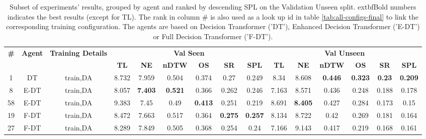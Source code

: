 \begin{table}
\centering
\caption{\label{tab:dagger}Subset of experiments' results, grouped by agent and ranked by descending SPL on the Validation Unseen split. 	extbf{Bold} numbers indicates the best results (except for TL). The rank in column \# is also used as a look up id in table \ref{tab:all-configs-final} to link the corresponding training configuration.     \newline The agents are based on Decision Transformer ('DT'), Enhanced Decision Transformer ('E-DT') or Full Decision Transformer ('F-DT').}
\begin{tabular}{@{\hskip3pt}c@{\hskip3pt}c@{\hskip3pt}c@{\hskip3pt}c@{\hskip3pt}c@{\hskip3pt}c@{\hskip3pt}c@{\hskip3pt}c@{\hskip3pt}c@{\hskip3pt}c@{\hskip3pt}c@{\hskip3pt}c@{\hskip3pt}c@{\hskip3pt}c@{\hskip3pt}c}
\toprule
\textbf{\#} & \textbf{Agent} & \textbf{Training Details} & \multicolumn{6}{c}{\textbf{Val Seen}} & \multicolumn{6}{c}{\textbf{Val Unseen}} \\
 \textbf{~} &     \textbf{~} &                \textbf{~} &       \textbf{TL} &     \textbf{NE} &   \textbf{nDTW} &     \textbf{OS} &     \textbf{SR} &    \textbf{SPL} &         \textbf{TL} &     \textbf{NE} &   \textbf{nDTW} &     \textbf{OS} &    \textbf{SR} &    \textbf{SPL} \\
\midrule
          1 &             DT &                  train,DA &             8.732 &           7.959 &           0.504 &           0.374 &            0.27 &           0.249 &                8.34 &           8.608 &  \textbf{0.446} &  \textbf{0.323} &  \textbf{0.23} &  \textbf{0.209} \\
          8 &           E-DT &                  train,DA &             8.057 &  \textbf{7.403} &  \textbf{0.521} &           0.366 &           0.262 &           0.246 &               7.163 &           8.571 &           0.436 &           0.248 &          0.188 &           0.178 \\
         58 &           E-DT &                  train,DA &             9.383 &            7.45 &            0.49 &  \textbf{0.413} &           0.251 &           0.219 &               8.691 &  \textbf{8.405} &           0.427 &           0.284 &          0.173 &            0.15 \\
         19 &           F-DT &                  train,DA &             8.472 &           7.663 &           0.517 &           0.364 &  \textbf{0.275} &  \textbf{0.257} &               8.134 &           8.722 &            0.42 &           0.269 &          0.181 &           0.164 \\
         27 &           F-DT &                  train,DA &             8.289 &           7.849 &           0.505 &           0.368 &           0.254 &            0.24 &               7.166 &           9.143 &           0.417 &           0.219 &          0.168 &           0.161 \\
\bottomrule
\end{tabular}
\end{table}
